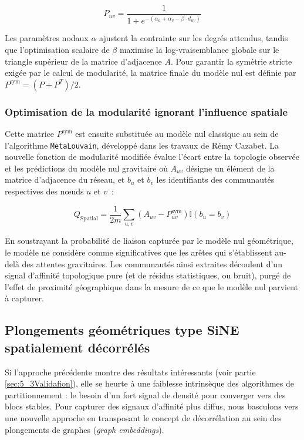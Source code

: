 \begin{equation}
    P_{uv} = \frac{1}{1 + e^{-(\alpha_u + \alpha_v - \beta \cdot d_{uv})}}
\end{equation}

Les paramètres nodaux $\alpha$ ajustent la contrainte sur les degrés attendus, tandis que l'optimisation scalaire de $\beta$ maximise la log-vraisemblance globale sur le triangle supérieur de la matrice d'adjacence $A$. Pour garantir la symétrie stricte exigée par le calcul de modularité, la matrice finale du modèle nul est définie par $P^{\text{sym}} = (P + P^T)/2$.

\subsubsection{Optimisation de la modularité ignorant l'influence spatiale}

Cette matrice $P^{\text{sym}}$ est ensuite substituée au modèle nul classique au sein de l'algorithme \texttt{MetaLouvain}, développé dans les travaux de Rémy Cazabet. La nouvelle fonction de modularité modifiée évalue l'écart entre la topologie observée et les prédictions du modèle nul gravitaire où $A_{uv}$ désigne un élément de la matrice d'adjacence du réseau, et $b_u$ et $b_v$ les identifiants des communautés respectives des nœuds $u$ et $v$~:

\begin{equation}
\label{eq:q_spatial}
    Q_{\text{Spatial}} = \frac{1}{2m} \sum_{u,v} \left( A_{uv} - P^{\text{sym}}_{uv} \right) \mathbb{I}(b_u = b_v)
\end{equation}

En soustrayant la probabilité de liaison capturée par le modèle nul géométrique, le modèle ne considère comme significatives que les arêtes qui s'établissent au-delà des attentes gravitaires. Les communautés ainsi extraites découlent d'un signal d'affinité topologique pure (et de résidus statistiques, ou bruit), purgé de l'effet de proximité géographique dans la mesure de ce que le modèle nul parvient à capturer.


\subsection{Plongements géométriques type SiNE spatialement décorrélés}

Si l'approche précédente montre des résultats intéressants (voir partie \ref{sec:5_3Validafion}), elle se heurte à une faiblesse intrinsèque des algorithmes de partitionnement : le besoin d'un fort signal de densité pour converger vers des blocs stables. Pour capturer des signaux d'affinité plus diffus, nous basculons vers une nouvelle approche en transposant le concept de décorrélation au sein des plongements de graphes (\textit{graph embeddings}).

